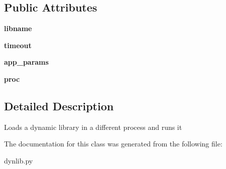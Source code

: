 \subsection*{Public Attributes}
\begin{DoxyCompactItemize}
\item 
\mbox{\label{classdlg_1_1apps_1_1dynlib_1_1_dynlib_proc_app_a5b50f41ad243e5ed26d57c05bece331a}} 
{\bfseries libname}
\item 
\mbox{\label{classdlg_1_1apps_1_1dynlib_1_1_dynlib_proc_app_abd9479ba55aeed49b8e56afbceade45e}} 
{\bfseries timeout}
\item 
\mbox{\label{classdlg_1_1apps_1_1dynlib_1_1_dynlib_proc_app_a33b00711dfbac2de7c184655f5c60a99}} 
{\bfseries app\+\_\+params}
\item 
\mbox{\label{classdlg_1_1apps_1_1dynlib_1_1_dynlib_proc_app_a9be70284bc6ef45c700c0a72fb054d2c}} 
{\bfseries proc}
\end{DoxyCompactItemize}


\subsection{Detailed Description}
\begin{DoxyVerb}Loads a dynamic library in a different process and runs it\end{DoxyVerb}
 

The documentation for this class was generated from the following file\+:\begin{DoxyCompactItemize}
\item 
dynlib.\+py\end{DoxyCompactItemize}
